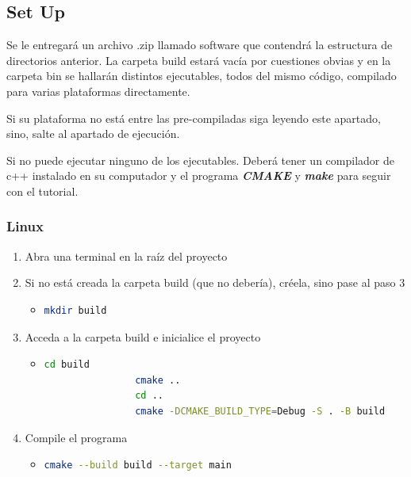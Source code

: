 \documentclass[a4paper, 12.5pt]{report}
\begin{document}
\subsection{Set Up} \label{subsec:set-up}

Se le entregará un archivo .zip llamado software que contendrá la estructura de directorios anterior. La carpeta build estará vacía por cuestiones obvias y en la carpeta bin se hallarán distintos ejecutables, todos del mismo código, compilado para varias plataformas directamente.

Si su plataforma no está entre las pre-compiladas siga leyendo este apartado, sino, salte al apartado de ejecución.

Si no puede ejecutar ninguno de los ejecutables. Deberá tener un compilador de c++ instalado en su computador y el programa \textbf{\textit{CMAKE}} y \textbf{\textit{make}}  para seguir con el tutorial.


\subsubsection*{Linux}

\begin{enumerate}
    \item Abra una terminal en la raíz del proyecto
    \item Si no está creada la carpeta build (que no debería), créela, sino pase al paso 3
          \begin{itemize}
              \item \begin{lstlisting}[language=bash]
				mkdir build
            \end{lstlisting}
          \end{itemize}
    \item Acceda a la carpeta build e inicialice el proyecto
          \begin{itemize}
              \item \begin{lstlisting}[language=bash]
				cd build
				cmake ..
				cd ..
				cmake -DCMAKE_BUILD_TYPE=Debug -S . -B build
            \end{lstlisting}
          \end{itemize}
    \item Compile el programa
          \begin{itemize}
              \item \begin{lstlisting}[language=bash]
				cmake --build build --target main
            \end{lstlisting}
          \end{itemize}
\end{enumerate}
\end{document}
